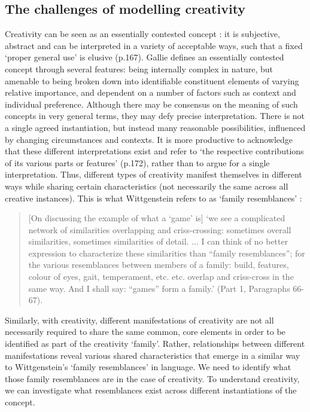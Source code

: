 \documentclass[10pt,letterpaper]{article}
\begin{document}
\subsection*{The challenges of modelling creativity} \label{cogPhil}


Creativity can be seen as an essentially contested concept \cite{gallie56}: it is subjective, abstract and can be interpreted in a variety of acceptable ways, such that a fixed `proper general use' is elusive \cite{gallie56} (p.167). Gallie \cite{gallie56} defines an essentially contested concept through several features: being internally complex in nature, but amenable to being broken down into identifiable constituent elements of varying relative importance, and dependent on a number of factors such as context and individual preference. Although there may be consensus on the meaning of such concepts in very general terms, they may defy precise interpretation. There is not a single agreed instantiation, but instead many reasonable possibilities, influenced by changing circumstances and contexts. It is more productive to acknowledge that these different interpretations exist and refer to `the respective contributions of its various parts or features' \cite{gallie56} (p.172), rather than to argue for a single interpretation. Thus, different types of creativity manifest themselves in different ways while sharing certain characteristics (not necessarily the same across all creative instances). This is what Wittgenstein refers to as `family resemblances' \cite{wittgenstein58}:

\begin{quote}
[On discussing the example of what a `game' is] `we see a complicated network of similarities overlapping and criss-crossing: sometimes overall similarities, sometimes similarities of detail. ... I can think of no better expression to characterize these similarities than ``family resemblances''; for the various resemblances between members of a family: build, features, colour of eyes, gait, temperament, etc. etc. overlap and criss-cross in the same way. And I shall say: ``games'' form a family.'
\cite{wittgenstein58} (Part 1, Paragraphs 66-67).
\end{quote}

Similarly, with creativity, different manifestations of creativity are not all necessarily required to share the same common, core elements in order to be identified as part of the creativity `family'. Rather, relationships between different manifestations reveal various shared characteristics that emerge in a similar way to Wittgenstein's `family resemblances' in language. We need to identify what those family resemblances are in the case of creativity. To understand creativity, we can investigate what resemblances exist across different instantiations of the concept. 
\end{document}
